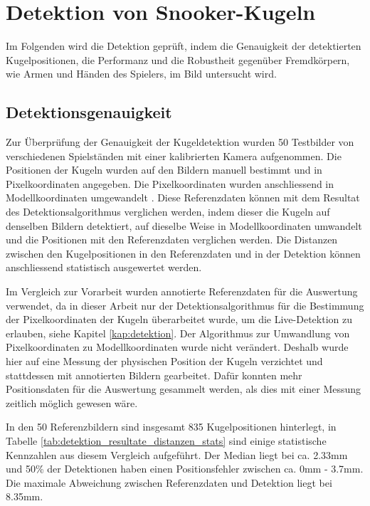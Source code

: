 \section{Detektion von Snooker-Kugeln}
Im Folgenden wird die Detektion geprüft, indem die Genauigkeit der detektierten Kugelpositionen, die Performanz und die
Robustheit gegenüber Fremdkörpern, wie Armen und Händen des Spielers, im Bild untersucht wird.

\subsection{Detektionsgenauigkeit}
Zur Überprüfung der Genauigkeit der Kugeldetektion wurden 50 Testbilder von verschiedenen Spielständen
mit einer kalibrierten Kamera aufgenommen.
Die Positionen der Kugeln wurden auf den Bildern manuell bestimmt und in Pixelkoordinaten angegeben.
Die Pixelkoordinaten wurden anschliessend in Modellkoordinaten umgewandelt \cite{project2:pixel_to_model_coordinates}.
Diese Referenzdaten können mit dem Resultat des Detektionsalgorithmus verglichen werden,
indem dieser die Kugeln auf denselben Bildern detektiert, auf dieselbe Weise in Modellkoordinaten umwandelt und
die Positionen mit den Referenzdaten verglichen werden.
Die Distanzen zwischen den Kugelpositionen in den Referenzdaten und in der Detektion können
anschliessend statistisch ausgewertet werden.

Im Vergleich zur Vorarbeit \cite{project2:resultate} wurden annotierte Referenzdaten für die Auswertung verwendet, da
in dieser Arbeit nur der Detektionsalgorithmus für die Bestimmung der Pixelkoordinaten der Kugeln überarbeitet wurde, um
die Live-Detektion zu erlauben, siehe Kapitel \ref{kap:detektion}.
Der Algorithmus zur Umwandlung von Pixelkoordinaten zu Modellkoordinaten \cite{project2:pixel_to_model_coordinates} wurde nicht verändert.
Deshalb wurde hier auf eine Messung der physischen Position der Kugeln verzichtet und stattdessen mit annotierten Bildern gearbeitet.
Dafür konnten mehr Positionsdaten für die Auswertung gesammelt werden, als dies mit einer Messung zeitlich möglich gewesen wäre.

In den 50 Referenzbildern sind insgesamt 835 Kugelpositionen hinterlegt, in Tabelle \ref{tab:detektion_resultate_distanzen_stats}
sind einige statistische Kennzahlen aus diesem Vergleich aufgeführt. Der Median liegt bei ca. 2.33mm und 50\% der Detektionen
haben einen Positionsfehler zwischen ca. 0mm - 3.7mm.
Die maximale Abweichung zwischen Referenzdaten und Detektion liegt bei 8.35mm.

